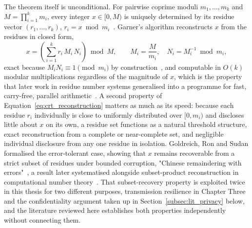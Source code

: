 \documentclass[12pt,a4paper,oneside]{book}
\begin{document}
The theorem itself is unconditional. For pairwise coprime moduli
$m_1,\ldots,m_k$ and $M = \prod_{i=1}^{k} m_i$, every integer
$x \in [0,M)$ is uniquely determined by its residue vector
$(r_1,\ldots,r_k)$, $r_i = x \bmod m_i$~\cite{garner1959residue,
hardy2008introduction}. Garner's algorithm reconstructs $x$ from the
residues in closed form,
\begin{equation}
x = \left( \sum_{i=1}^{k} r_i\, M_i\, N_i \right) \bmod M, \qquad
M_i = \frac{M}{m_i}, \quad N_i = M_i^{-1} \bmod m_i,
\label{eq:crt_reconstruction}
\end{equation}
exact because $M_i N_i \equiv 1 \pmod{m_i}$ by
construction~\cite{garner1959residue, knuth1997art}, and computable in
$O(k)$ modular multiplications regardless of the magnitude of $x$, which is
the property that later work in residue number systems generalised into a
programme for fast, carry-free, parallel
arithmetic~\cite{ding1996remainder, parhami2010computer}. A second property
of Equation~\ref{eq:crt_reconstruction} matters as much as its speed:
because each residue $r_i$ individually is close to uniformly distributed
over $[0,m_i)$ and discloses little about $x$ on its own, a residue set
functions as a natural threshold structure, exact reconstruction from a
complete or near-complete set, and negligible individual disclosure from
any one residue in isolation. Goldreich, Ron and Sudan formalised the
error-tolerant case, showing that $x$ remains recoverable from a strict
subset of residues under bounded corruption, "Chinese remaindering with
errors"~\cite{goldreich1999china}, a result later systematised alongside
subset-product reconstruction in computational number
theory~\cite{shoup2009computational}. That subset-recovery property is
exploited twice in this thesis for two different purposes, transmission
resilience in Chapter Three and the confidentiality argument taken up in
Section~\ref{subsec:lit_privacy} below, and the literature reviewed here
establishes both properties independently without connecting them.
\end{document}
